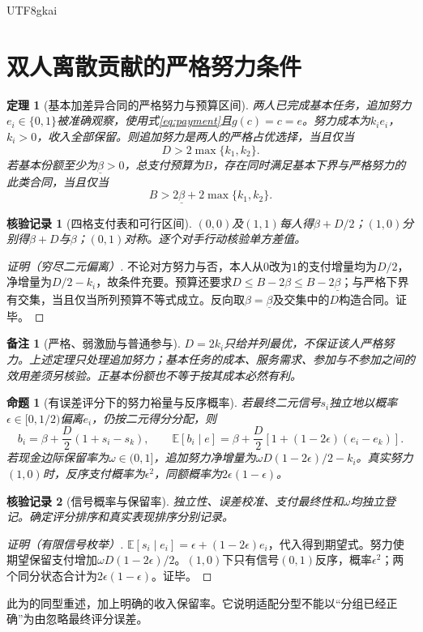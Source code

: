 \documentclass[12pt,a4paper,openany]{report}
\newtheorem{theorem}{定理}[chapter]
\newtheorem{proposition}{命题}[chapter]
\newtheorem{remark}{备注}[chapter]
\newtheorem{Certificate}{核验记录}[chapter]
\newcommand{\EE}{\mathbb E}
\begin{document}
\begin{CJK*}{UTF8}{gkai}
\section{双人离散贡献的严格努力条件}
\begin{theorem}[基本加差异合同的严格努力与预算区间]
\label{thm:binary-effort}
两人已完成基本任务，追加努力$e_i\in\{0,1\}$被准确观察，使用式\eqref{eq:payment}且$g(c)=c=e$。努力成本为$k_ie_i$，$k_i>0$，收入全部保留。则追加努力是两人的严格占优选择，当且仅当
\[
 D>2\max\{k_1,k_2\}.
\]
若基本份额至少为$\underline\beta>0$，总支付预算为$B$，存在同时满足基本下界与严格努力的此类合同，当且仅当
\[
 B>2\underline\beta+2\max\{k_1,k_2\}.
\]
\end{theorem}
\begin{Certificate}[四格支付表和可行区间]
$(0,0)$及$(1,1)$每人得$\beta+D/2$；$(1,0)$分别得$\beta+D$与$\beta$；$(0,1)$对称。逐个对手行动核验单方差值。
\end{Certificate}
\begin{proof}[证明（穷尽二元偏离）]
不论对方努力与否，本人从$0$改为$1$的支付增量均为$D/2$，净增量为$D/2-k_i$，故条件充要。预算还要求$D\le B-2\beta\le B-2\underline\beta$；与严格下界有交集，当且仅当所列预算不等式成立。反向取$\beta=\underline\beta$及交集中的$D$构造合同。证毕。
\end{proof}
\begin{remark}[严格、弱激励与普通参与]
$D=2k_i$只给并列最优，不保证该人严格努力。上述定理只处理追加努力；基本任务的成本、服务需求、参加与不参加之间的效用差须另核验。正基本份额也不等于按其成本必然有利。
\end{remark}

\begin{proposition}[有误差评分下的努力裕量与反序概率]
\label{prop:noisy}
若最终二元信号$s_i$独立地以概率$\epsilon\in[0,1/2)$偏离$e_i$，仍按二元得分分配，则
\[
 b_i=\beta+\frac D2(1+s_i-s_k),\qquad
 \EE[b_i\mid e]=\beta+\frac D2[1+(1-2\epsilon)(e_i-e_k)].
\]
若现金边际保留率为$\omega\in(0,1]$，追加努力净增量为$\omega D(1-2\epsilon)/2-k_i$。真实努力$(1,0)$时，反序支付概率为$\epsilon^2$，同额概率为$2\epsilon(1-\epsilon)$。
\end{proposition}
\begin{Certificate}[信号概率与保留率]
独立性、误差校准、支付最终性和$\omega$均独立登记。确定评分排序和真实表现排序分别记录。
\end{Certificate}
\begin{proof}[证明（有限信号枚举）]
$\EE[s_i\mid e_i]=\epsilon+(1-2\epsilon)e_i$，代入得到期望式。努力使期望保留支付增加$\omega D(1-2\epsilon)/2$。$(1,0)$下只有信号$(0,1)$反序，概率$\epsilon^2$；两个同分状态合计为$2\epsilon(1-\epsilon)$。证毕。
\end{proof}
此为\cite[“有误差时的预算、激励与贡献排序”]{SourceMarket}的同型重述，加上明确的收入保留率。它说明适配分型不能以“分组已经正确”为由忽略最终评分误差。


\end{CJK*}
\end{document}
